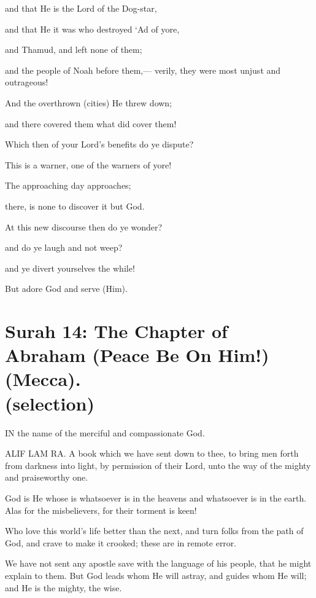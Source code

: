 \documentclass[fontsize=14pt, letterpaper, notitlepage, openany, DIV=12]{scrbook} %
\begin{document}
\noindent[53:49]
and that He is the Lord of the Dog-star,

\noindent[53:50]
and that He it was who destroyed `Ad of yore,

\noindent[53:51]
and Thamud, and left none of them;

\noindent[53:52]
and the people of Noah before them,--- verily, they were most unjust and outrageous!

\noindent[53:53]
And the overthrown (cities) He threw down;

\noindent[53:54]
and there covered them what did cover them!

\noindent[53:55]
Which then of your Lord's benefits do ye dispute?

\noindent[53:56]
This is a warner, one of the warners of yore!

\noindent[53:57]
The approaching day approaches;

\noindent[53:58]
there, is none to discover it but God.

\noindent[53:59]
At this new discourse then do ye wonder?

\noindent[53:60]
and do ye laugh and not weep?

\noindent[53:61]
and ye divert yourselves the while!

\noindent[53:62]
But adore God and serve (Him).


\section[Surah 14: The Chapter of Abraham (Peace Be On Him!) (Mecca).]{Surah 14: The Chapter of Abraham (Peace Be On Him!) (Mecca).\\ (selection)}


IN the name of the merciful and compassionate God.

\noindent[14:1]
ALIF LAM RA. A book which we have sent down to thee, to bring men forth from
darkness into light, by permission of their Lord, unto the way of the mighty and praiseworthy
one.

\noindent[14:2]
God is He whose is whatsoever is in the heavens and whatsoever is in the earth. Alas for
the misbelievers, for their torment is keen!

\noindent[14:3]
Who love this world's life better than the next, and turn folks from the path of God, and
crave to make it crooked; these are in remote error.

\noindent[14:4]
We have not sent any apostle save with the language of his people, that he might explain
to them. But God leads whom He will astray, and guides whom He will; and He is the mighty,
the wise.
\end{document}
